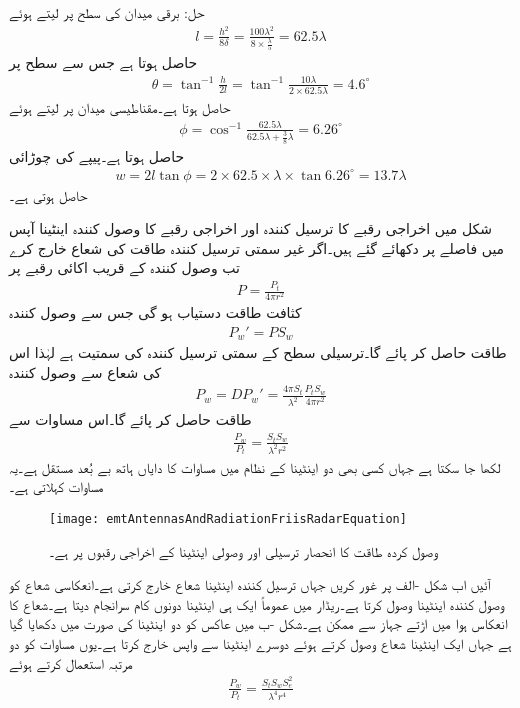 حل:
برقی میدان کی سطح پر  لیتے ہوئے 
\begin{align*}
l=\frac{h^2}{8 \delta}=\frac{100 \lambda^2}{8 \times \frac{\lambda}{5}}=62.5 \lambda
\end{align*}
حاصل ہوتا ہے جس سے  سطح پر 
\begin{align*}
\theta=\tan^{-1}\frac{h}{2l}=\tan^{-1} \frac{10 \lambda}{2\times 62.5 \lambda}=4.6^{\circ}
\end{align*}
حاصل ہوتا ہے۔مقناطیسی میدان پر  لیتے ہوئے 
\begin{align*}
\phi=\cos^{-1} \frac{62.5\lambda}{62.5\lambda+\frac{3}{8}\lambda}=6.26^{\circ}
\end{align*}
حاصل ہوتا ہے۔پیپے کی چوڑائی
\begin{align*}
w=2 l \tan \phi=2 \times 62.5 \times \lambda \times \tan 6.26^{\circ}=13.7 \lambda
\end{align*}
حاصل ہوتی ہے۔

شکل  میں  اخراجی رقبے کا ترسیل کنندہ  اور  اخراجی رقبے کا وصول کنندہ اینٹینا آپس میں  فاصلے پر دکھائے گئے ہیں۔اگر غیر سمتی ترسیل کنندہ   طاقت کی شعاع خارج کرے تب وصول کنندہ کے قریب اکائی رقبے پر 
\begin{align}
P=\frac{P_t}{4\pi r^2}
\end{align}
کثافت طاقت دستیاب ہو گی جس سے وصول کنندہ
\begin{align}
P_w'=P S_w
\end{align}
طاقت حاصل کر پائے گا۔ترسیلی سطح  کے سمتی ترسیل کنندہ کی سمتیت  ہے لہٰذا اس کی شعاع سے وصول کنندہ
\begin{align}
P_w=D P_w'= \frac{4\pi S_t}{\lambda^2}\frac{P_t S_w}{4\pi r^2}
\end{align}
طاقت حاصل کر پائے گا۔اس مساوات سے
\begin{align}\label{مساوات_اینٹینا_ریڈار_الف}
\frac{P_w}{P_t}=\frac{S_t S_w}{\lambda^2 r^2}
\end{align}
لکھا جا سکتا ہے جہاں کسی بھی دو اینٹینا کے نظام میں مساوات کا دایاں ہاتھ بے بُعد مستقل ہے۔یہ مساوات  کہلاتی ہے۔
\begin{figure}
\centering
\texttt{[image: emtAntennasAndRadiationFriisRadarEquation]}
\caption{وصول کردہ طاقت کا انحصار ترسیلی اور وصولی اینٹینا کے اخراجی رقبوں پر ہے۔}
\label{شکل_اینٹینا_ریڈار_الف}
\end{figure}
آئیں اب شکل -الف پر غور کریں  جہاں ترسیل کنندہ اینٹینا شعاع خارج کرتی ہے۔انعکاسی شعاع کو وصول کنندہ اینٹینا وصول کرتا ہے۔ریڈار میں عموماً ایک ہی اینٹینا دونوں کام سرانجام دیتا ہے۔شعاع کا انعکاس ہوا میں اڑتے جہاز سے ممکن ہے۔شکل -ب میں عاکس کو دو اینٹینا کی صورت میں دکھایا گیا ہے جہاں ایک اینٹینا شعاع وصول کرتے ہوئے دوسرے اینٹینا سے واپس خارج کرتا ہے۔یوں مساوات  کو دو مرتبہ استعمال کرتے ہوئے
\begin{align}
\frac{P_w}{P_t}=\frac{S_t S_w S^2_e}{\lambda^4 r^4}
\end{align}


